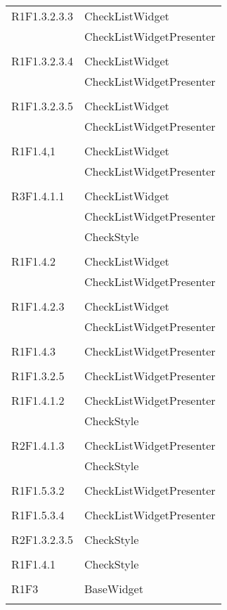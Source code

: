 \begin{center}
\begin{longtable}{|p{7cm}|p{7cm}|}
		R1F1.3.2.3.3 & CheckListWidget \\ & CheckListWidgetPresenter \\ & \\ \hline
		R1F1.3.2.3.4 & CheckListWidget \\ & CheckListWidgetPresenter \\ & \\ \hline
		R1F1.3.2.3.5 & CheckListWidget \\ & CheckListWidgetPresenter \\ & \\ \hline
		R1F1.4,1 & CheckListWidget \\ & CheckListWidgetPresenter \\ & \\ \hline
		R3F1.4.1.1 & CheckListWidget \\ & CheckListWidgetPresenter \\ & CheckStyle \\ & \\ \hline
		R1F1.4.2 & CheckListWidget \\ & CheckListWidgetPresenter \\ & \\ \hline
		R1F1.4.2.3 & CheckListWidget \\ & CheckListWidgetPresenter \\ & \\ \hline
		R1F1.4.3 & CheckListWidgetPresenter \\ & \\ \hline
		R1F1.3.2.5 & CheckListWidgetPresenter \\ & \\ \hline
		R1F1.4.1.2 & CheckListWidgetPresenter \\ & CheckStyle \\ & \\ \hline
		R2F1.4.1.3 & CheckListWidgetPresenter \\ & CheckStyle \\ & \\ \hline
		R1F1.5.3.2 & CheckListWidgetPresenter \\ & \\ \hline
		R1F1.5.3.4 & CheckListWidgetPresenter \\ & \\ \hline
		R2F1.3.2.3.5 & CheckStyle \\ & \\ \hline
		R1F1.4.1 & CheckStyle \\ & \\ \hline
		R1F3 & BaseWidget \\ & \\ \hline

\end{longtable}
\end{center}
